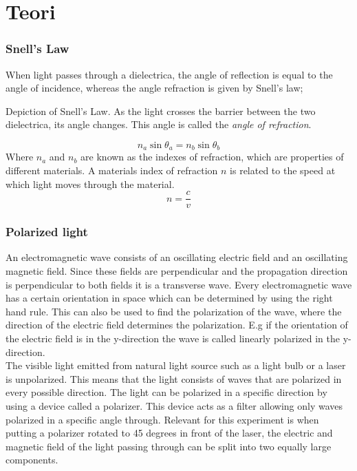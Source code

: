 \documentclass[working]{inputs/tuftebook}
\begin{document}

\section*{Teori}
\subsubsection{Snell's Law}
When light passes through a dielectrica, the angle of reflection is equal to the angle of incidence, whereas the angle refraction is given by Snell's law;
\begin{marginfigure}
    \caption{Depiction of Snell's Law. As the light crosses the barrier between the two dielectrica, its angle changes. This angle is called the \textit{angle of refraction}.}
    \label{fig:snell}
\end{marginfigure}
\[
	\boxed{n_a \sin \theta_a = n_b \sin \theta_b}
\]
Where $n_a$ and $n_b$ are known as the indexes of refraction, which are properties of different materials. A materials index of refraction $n$ is related to the speed at which light moves through the material.
\[
n = \frac{c}{v}
\]
\subsubsection{Polarized light}
An electromagnetic wave consists of an oscillating electric field and an oscillating magnetic field. Since these fields are perpendicular and the propagation direction is perpendicular to both fields it is a transverse wave. Every electromagnetic wave has a certain orientation in space which can be determined by using the right hand rule. This can also be used to find the polarization of the wave, where the direction of the electric field determines the polarization. E.g if the orientation of the electric field is in the y-direction the wave is called linearly polarized in the y-direction.
\\
The visible light emitted from natural light source such as a light bulb or a laser is unpolarized. This means that the light consists of waves that are polarized in every possible direction. The light can be polarized in a specific direction by using a device called a polarizer. This device acts as a filter allowing only waves polarized in a specific angle through. Relevant for this experiment is when putting a polarizer rotated to 45 degrees in front of the laser, the electric and magnetic field of the light passing through can be split into two equally large components.
\end{document}
